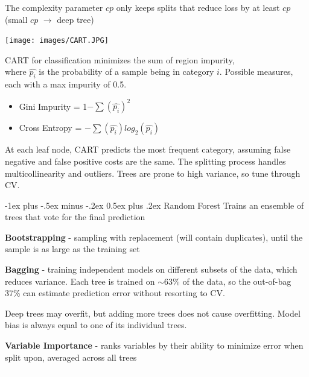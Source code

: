 \documentclass[10pt,landscape]{article}
\makeatletter
\renewcommand{\subsection}{\@startsection{subsection}{2}{0mm}%
                                {-1ex plus -.5ex minus -.2ex}%
                                {0.5ex plus .2ex}%
                                {\normalfont\normalsize\bfseries}}
\makeatother
\begin{document}
\begin{multicols}{3}
The complexity parameter $cp$ only keeps splits that reduce loss by at least $cp$ (small $cp$ $\to$ deep tree)
\smallskip
\begin{center}
\vspace{-1mm}
    \texttt{[image: images/CART.JPG]}
\end{center}
\vspace{-2mm}
CART for classification minimizes the sum of region impurity, \\
where $\hat{p_i}$ is the probability of a sample being in category $i$.
Possible measures, each with a max impurity of 0.5.
\begin{itemize}[label={--},leftmargin=4mm]
\vspace{-1mm}
\itemsep -.4mm
\item Gini Impurity = 1$ - \sum (\hat{p_i})^2$
\item Cross Entropy = $-\sum (\hat{p_i}) log_2(\hat{p_i})$
\end{itemize}
At each leaf node, CART predicts the most frequent category, assuming false negative and false positive costs are the same. The splitting process handles multicollinearity and outliers. Trees are prone to high variance, so tune through CV.

\subsection{Random Forest}
Trains an ensemble of trees that vote for the final prediction

\textbf{Bootstrapping} - sampling with replacement (will contain duplicates), until the sample is as large as the training set

\textbf{Bagging} - training independent models on different subsets of the data, which reduces variance. Each tree is trained on $\sim$63\% of the data, so the out-of-bag 37\% can estimate prediction error without resorting to CV.

Deep trees may overfit, but adding more trees does not cause overfitting. Model bias is always equal to one of its individual trees.

\textbf{Variable Importance} - ranks variables by their ability to minimize error when split upon, averaged across all trees
\columnbreak
\\\textcolor{white}{.}\vspace{-5mm}\\ %


\end{multicols}
\end{document}
